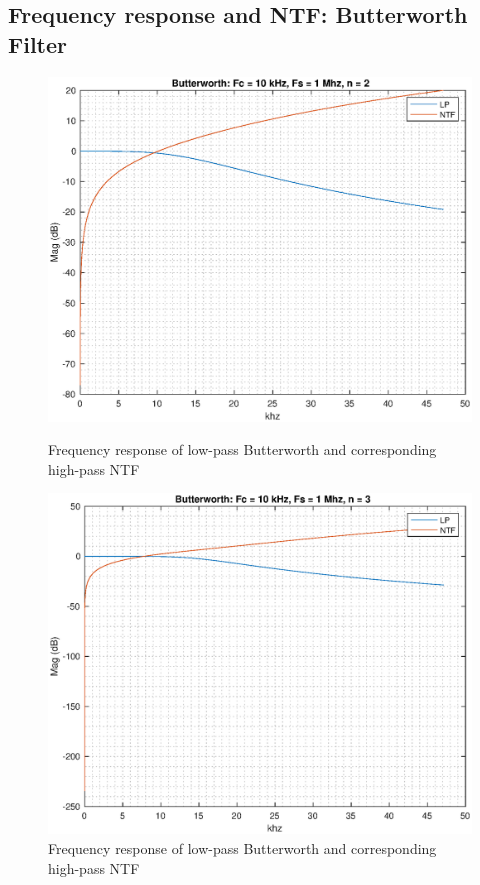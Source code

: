 \documentclass[a4paper]{article}
\begin{document}
\newpage
\subsection{Frequency response and NTF: Butterworth Filter}

\begin{figure}[!h]
	\centering
	\begin{minipage}{0.45\linewidth}
		\centering
		\includegraphics[scale = 0.45]{plots/but_lp_ntf_2_10.eps}
		\caption{Frequency response of low-pass Butterworth and  corresponding high-pass  NTF}
	\end{minipage}
	\hfil
	\begin{minipage}{0.45\linewidth}
		\centering
		\includegraphics[scale = 0.45]{plots/but_lp_ntf_3_10.eps}
		\caption{Frequency response of low-pass Butterworth and  corresponding high-pass  NTF}
	\end{minipage}
\end{figure}
\end{document}
